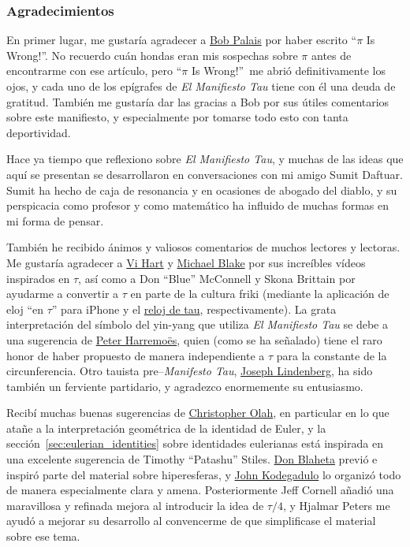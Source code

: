 
  \subsubsection{Agradecimientos} %
  \label{sec:acknowledgments}

En primer lugar, me gustaría agradecer a \href{http://www.math.utah.edu/~palais}{Bob Palais} por haber escrito ``$\pi$ Is Wrong!''. No recuerdo cuán hondas eran mis sospechas sobre $\pi$ antes de encontrarme con ese artículo, pero ``$\pi$ Is Wrong!''\ me abrió definitivamente los ojos, y cada uno de los epígrafes de \emph{El Manifiesto Tau} tiene con él una deuda de gratitud. También me gustaría dar las gracias a Bob por sus útiles comentarios sobre este manifiesto, y especialmente por tomarse todo esto con tanta deportividad.

Hace ya tiempo que reflexiono sobre \emph{El Manifiesto Tau}, y muchas de las ideas que aquí se presentan se desarrollaron en conversaciones con mi amigo Sumit Daftuar. Sumit ha hecho de caja de resonancia y en ocasiones de abogado del diablo, y su perspicacia como profesor y como matemático ha influido de muchas formas en mi forma de pensar.

También he recibido ánimos y valiosos comentarios de muchos lectores y lectoras. Me gustaría agradecer a \href{http://www.youtube.com/watch?v=jG7vhMMXagQ}{Vi Hart} y \href{http://www.youtube.com/watch?v=3174T-3-59Q}{Michael Blake} por sus increíbles vídeos inspirados en $\tau$, así como a Don ``Blue'' McConnell y Skona Brittain por ayudarme a convertir a $\tau$ en parte de la cultura friki (mediante la aplicación de eloj ``en $\tau$'' para iPhone y el \href{http://www.sbcrafts.net/clocks/}{reloj de tau}, respectivamente). La grata interpretación del símbolo del yin-yang que utiliza \emph{El Manifiesto Tau} se debe a una sugerencia de \href{http://www.harremoes.dk/Peter/}{Peter Harremo\"{e}s}, quien (como se ha señalado) tiene el raro honor de haber propuesto de manera independiente a $\tau$ para la constante de la circunferencia. Otro tauista pre--\emph{Manifesto Tau}, \href{https://sites.google.com/site/taubeforeitwascool/}{Joseph Lindenberg}, ha sido también un ferviente partidario, y agradezco enormemente su entusiasmo. 

Recibí muchas buenas sugerencias de \href{http://christopherolah.wordpress.com/about-me}{Christopher Olah}, en particular en lo que atañe a la interpretación geométrica de la identidad de Euler, y la sección~\ref{sec:eulerian_identities} sobre identidades eulerianas está inspirada en una excelente sugerencia de Timothy ``Patashu'' Stiles. \href{http://www.blahedo.org/blog/archives/001083.html}{Don Blaheta} previó e inspiró parte del material sobre hiperesferas, y \href{http://spikedmath.com/forum/viewtopic.php?f=30&t=147\#p1577}{John Kodegadulo} lo organizó todo de manera especialmente clara y amena. Posteriormente Jeff Cornell añadió una maravillosa y refinada mejora al introducir la idea de $\tau/4$, y Hjalmar Peters me ayudó a mejorar su desarrollo al convencerme de que simplificase el material sobre ese tema. 

